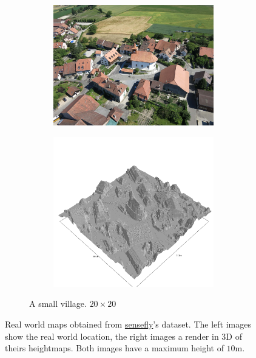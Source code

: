\documentclass[../document.tex]{subfiles}
\begin{document}
\begin{figure}[htbp]
\begin{subfigure}[b]{1\textwidth}
\begin{subfigure}[b]{0.45\textwidth}
        \includegraphics[width=\textwidth]{../img/sullens-real.jpg}
    \end{subfigure}  
    \begin{subfigure}[b]{0.45\textwidth}
        \includegraphics[width=\textwidth]{../img/hm3d_borders/sullens.png}
    \end{subfigure} 
    \caption{A small village. $20 \times 20$} 
\end{subfigure}
\caption{Real world maps obtained from \href{https://www.sensefly.com/education/datasets/}{sensefly}'s dataset. The left images show the real world location, the right images a render in 3D of theirs heightmaps. Both images have a maximum height of $10$m.}  
\label{fig : real-maps}
\end{figure}
\end{document}
